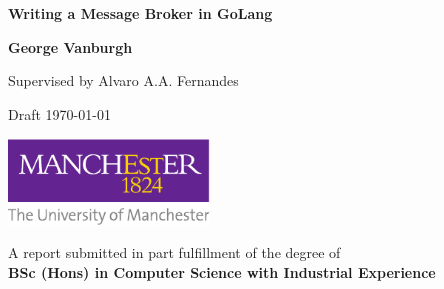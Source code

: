 \documentclass[a4paper,12pt,titlepage]{report}
\begin{document}
  

  \begin{titlepage}
    \begin{center}
        \vspace*{1cm}

        \Huge
        \textbf{Writing a Message Broker in GoLang}

        \vspace{2.0cm}
        \LARGE

        \textbf{George Vanburgh}

        \vspace{0.5cm}
        Supervised by Alvaro A.A. Fernandes

        \vspace{0.5cm}
        Draft \today

        \vfill

        \includegraphics[width=0.4\textwidth]{figures/manchesterLogo}

        \vspace{0.8cm}
        \large

        A report submitted in part fulfillment of the degree of \\
        \textbf{BSc (Hons) in Computer Science with Industrial Experience}

    \end{center}
  \end{titlepage}

  \begin{abstract}
    
  \end{abstract}

  \renewcommand{\abstractname}{Acknowledgements}
  \begin{abstract}
  \end{abstract}

  \tableofcontents
  \begin{versionhistory}
  \end{versionhistory}
  \newpage

  

  

  

  

  

  

  \begin{appendix}
    
  \end{appendix}

  \newpage

  \printglossaries

  \newpage

  \printbibliography
\end{document}
